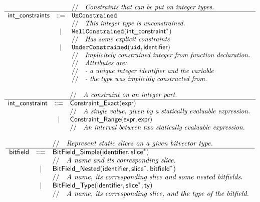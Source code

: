 \documentclass{book}
\begin{document}
\[
  \begin{array}{rcl}
    & & //\quad\textit{Constraints that can be put on integer types.}\   \\
    \hline
    \textsf{int\_constraints} & ::=
      & \texttt{UnConstrained}                                      \\
    & & //\quad\textit{This integer type is unconstrained.}\             \\
    &|& \texttt{WellConstrained}(\textsf{int\_constraint}^{*})                \\
    & & //\quad\textit{Has some explicit constraints}\                   \\
    &|& \texttt{UnderConstrained}(\texttt{uid}, \textsf{identifier})        \\
    & & //\quad\textit{Implicitely constrained integer from function declaration.}\  \\
    & & //\quad\textit{Attributes are:}\  \\
    & & //\quad\textit{- a unique integer identifier and the variable}\  \\
    & & //\quad\textit{- the type was implicitly constructed from.}\  \\
  \end{array}
\]

\[
\begin{array}{rcl}
& & //\quad\textit{A constraint on an integer part.}\ \\
\hline
\textsf{int\_constraint} &::=& \textsf{Constraint\_Exact}(\textsf{expr}) \\
  & & //\quad\textit{A single value, given by a statically evaluable expression.}\ \\
  &|& \textsf{Constraint\_Range}(\textsf{expr}, \textsf{expr}) \\
  & & //\quad\textit{An interval between two statically evaluable expression.}\ \\
\end{array}
\]

\[
\begin{array}{rcl}
& & //\quad\textit{Represent static slices on a given bitvector type.}\ \\
\hline
\textsf{bitfield} &::=& \textsf{BitField\_Simple}(\textsf{identifier}, \textsf{slice}^{*}) \\
  & & //\quad\textit{A name and its corresponding slice.}\ \\
  &|& \textsf{BitField\_Nested}(\textsf{identifier}, \textsf{slice}^{*}, \textsf{bitfield}^{*}) \\
  & & //\quad\textit{A name, its corresponding slice and some nested bitfields.}\ \\
  &|& \textsf{BitField\_Type}(\textsf{identifier}, \textsf{slice}^{*}, \textsf{ty}) \\
  & & //\quad\textit{A name, its corresponding slice, and the type of the bitfield.}\ \\
\end{array}
\]
\end{document}
